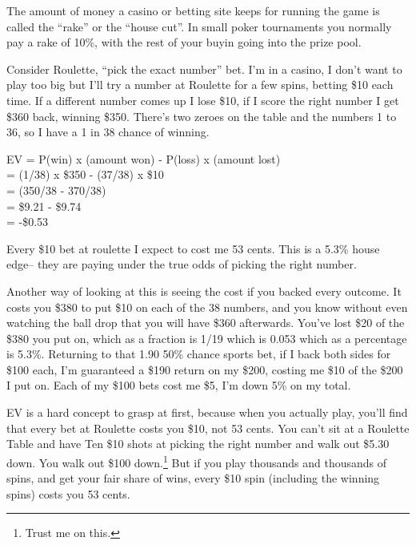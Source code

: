 The amount of money a casino or betting site keeps for running the
game is called the ``rake'' or the ``house cut''.
In small poker tournaments you normally pay a rake of 10\%, with the
rest of your buyin going into the prize pool.

Consider Roulette, ``pick the exact number'' bet. I'm in a casino,
I don't want to play too big but I'll try a number at Roulette for a few
spins, betting \$10 each time. If a different number comes up I lose \$10,
if I score the right number I get \$360 back, winning \$350. There's two
zeroes on the table and the numbers 1 to 36, so I have a 1 in 38 chance of
winning.

EV = P(win) x (amount won) - P(loss) x (amount lost) \\
   = (1/38) x \$350 - (37/38) x \$10 \\
   = (350/38 - 370/38)  \\
   = \$9.21 - \$9.74 \\
   = -\$0.53

Every \$10 bet at roulette I expect to cost me 53 cents. This is a 5.3\% house
edge-- they are paying under the true odds of picking the right
number.

Another way of looking at this is seeing the cost if you backed every
outcome. It costs you \$380 to put \$10 on each of the 38 numbers, and
you know without even watching the ball drop that you will have \$360
afterwards. You've lost \$20 of the \$380 you put on, which as a
fraction is 1/19 which is 0.053 which as a percentage is 5.3\%.
Returning to that 1.90 50\% chance sports bet, if I back both sides for
\$100 each, I'm guaranteed a \$190 return on my \$200, costing me \$10
of the \$200 I put on. Each of my \$100 bets cost me \$5, I'm down 5\%
on my total.


EV is a hard concept to grasp at first, because when you actually
play, you'll find that every bet at Roulette costs you \$10, not
53 cents. You can't sit at a Roulette Table and
have Ten \$10 shots at picking the right number and walk out \$5.30
down. You walk out \$100 down.\footnote{Trust me on this.} But if you
play thousands and thousands of spins, and get your fair share of
wins, every \$10 spin (including the winning spins) costs you 53
cents.

